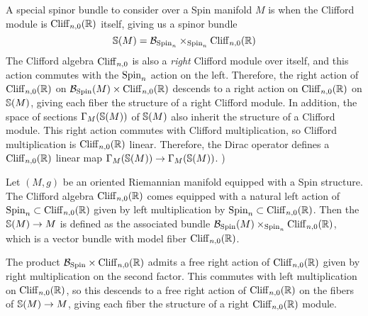 A special spinor bundle to consider over a Spin manifold $M$ is when the Clifford
module is $\Cliff_{n,0}(\R)$ itself, giving us a spinor bundle
\[
\S(M) = \B_{\Spin_n} \times_{\Spin_n} \Cliff_{n,0}(\R)
\]
The Clifford algebra $\Cliff_{n,0}$ is also a \emph{right} Clifford module over
itself, and this action commutes with the $\Spin_n$ action on the left. Therefore,
the right action of $\Cliff_{n,0}(\R)$ on $\B_{\Spin}(M) \times \Cliff_{n,0}(\R)$
descends to a right action on $\Cliff_{n,0}(\R)$ on $\S(M)$, giving each fiber
the structure of a right Clifford module. In addition, the space of sections
$\Gamma_M(\S(M))$ of $\S(M)$ also inherit the structure of a Clifford module.
This right action commutes with Clifford  multiplication, so Clifford multiplication is
$\Cliff_{n,0}(\R)$ linear. Therefore, the Dirac operator defines a $\Cliff_{n,0}(\R)$
linear map $\Gamma_M(\S(M)) \to \Gamma_M(\S(M))$.
)
%
\iffalse
%
\begin{defn}
 Let $(M,g)$ be an oriented Riemannian manifold equipped with a Spin structure.
 The Clifford algebra $\Cliff_{n,0}(\R)$ comes equipped with a natural left
 action of $\Spin_n \subset \Cliff_{n,0}(\R)$ given by left multiplication by
 $\Spin_n \subset \Cliff_{n,0}(\R)$. Then the  $\S(M) \to M$ is
 defined as the associated bundle $\B_{\Spin}(M) \times_{\Spin_n} \Cliff_{n,0}(\R)$,
 which is a vector bundle with model fiber $\Cliff_{n,0}(\R)$.
\end{defn}
%
The product $\B_{\Spin} \times \Cliff_{n,0}(\R)$ admits a free right action of
$\Cliff_{n,0}(\R)$ given by right multiplication on the second factor. This
commutes with left multiplication on $\Cliff_{n,0}(\R)$, so this descends to a
free right action of $\Cliff_{n,0}(\R)$ on the fibers of $\S(M) \to M$, giving
each fiber the structure of a right $\Cliff_{n,0}(\R)$ module. \\
%

